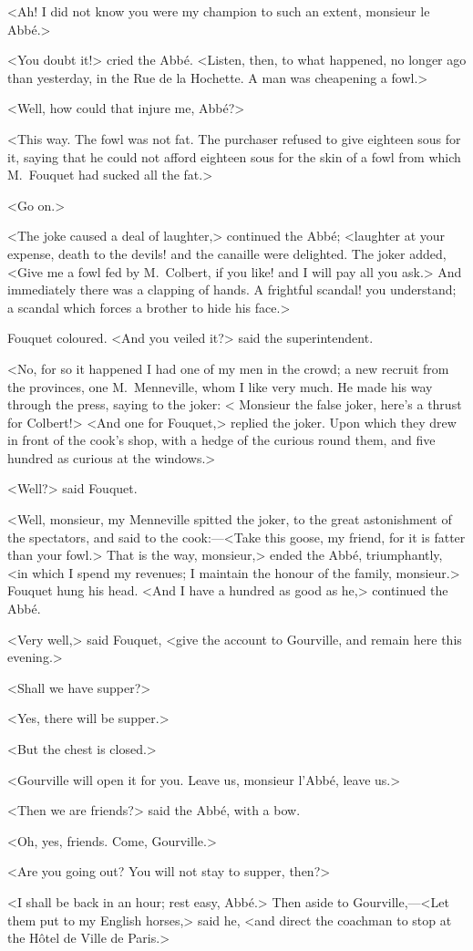 <Ah! I did not know you were my champion to such an extent, monsieur le Abbé.>

<You doubt it!> cried the Abbé. <Listen, then, to what happened, no longer ago than yesterday, in the Rue de la Hochette. A man was cheapening a fowl.>

<Well, how could that injure me, Abbé?>

<This way. The fowl was not fat. The purchaser refused to give eighteen sous for it, saying that he could not afford eighteen sous for the skin of a fowl from which M.~Fouquet had sucked all the fat.>

<Go on.>

<The joke caused a deal of laughter,> continued the Abbé; <laughter at your expense, death to the devils! and the canaille were delighted. The joker added, <Give me a fowl fed by M.~Colbert, if you like! and I will pay all you ask.> And immediately there was a clapping of hands. A frightful scandal! you understand; a scandal which forces a brother to hide his face.>

Fouquet coloured. <And you veiled it?> said the superintendent.

<No, for so it happened I had one of my men in the crowd; a new recruit from the provinces, one M.~Menneville, whom I like very much. He made his way through the press, saying to the joker: < Monsieur the false joker, here's a thrust for Colbert!> <And one for Fouquet,> replied the joker. Upon which they drew in front of the cook's shop, with a hedge of the curious round them, and five hundred as curious at the windows.>

<Well?> said Fouquet.

<Well, monsieur, my Menneville spitted the joker, to the great astonishment of the spectators, and said to the cook:—<Take this goose, my friend, for it is fatter than your fowl.> That is the way, monsieur,> ended the Abbé, triumphantly, <in which I spend my revenues; I maintain the honour of the family, monsieur.> Fouquet hung his head. <And I have a hundred as good as he,> continued the Abbé.

<Very well,> said Fouquet, <give the account to Gourville, and remain here this evening.>

<Shall we have supper?>

<Yes, there will be supper.>

<But the chest is closed.>

<Gourville will open it for you. Leave us, monsieur l'Abbé, leave us.>

<Then we are friends?> said the Abbé, with a bow.

<Oh, yes, friends. Come, Gourville.>

<Are you going out? You will not stay to supper, then?>

<I shall be back in an hour; rest easy, Abbé.> Then aside to Gourville,—<Let them put to my English horses,> said he, <and direct the coachman to stop at the Hôtel de Ville de Paris.> 